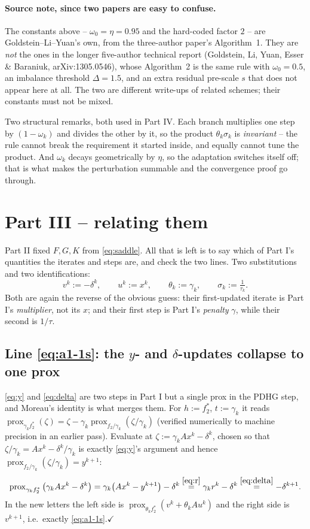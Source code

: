 \documentclass[11pt]{article}
\newcommand{\prox}{\operatorname{prox}}
\begin{document}
\paragraph{Source note, since two papers are easy to confuse.} The constants
above -- $\omega_0=\eta=0.95$ and the hard-coded factor $2$ -- are
Goldstein--Li--Yuan's own, from the three-author paper's Algorithm~1. They are
\emph{not} the ones in the longer five-author technical report
(Goldstein, Li, Yuan, Esser \& Baraniuk, arXiv:1305.0546), whose Algorithm~2 is
the same rule with $\omega_0=0.5$, an imbalance threshold $\Delta=1.5$, and an
extra residual pre-scale $s$ that does not appear here at all. The two are
different write-ups of related schemes; their constants must not be mixed.

Two structural remarks, both used in Part IV. Each branch multiplies one step by
$(1-\omega_k)$ and divides the other by it, so the product $\theta_k\sigma_k$ is
\emph{invariant} -- the rule cannot break the requirement it started inside, and
equally cannot tune the product. And $\omega_k$ decays geometrically by $\eta$, so
the adaptation switches itself off; that is what makes the perturbation summable
and the convergence proof go through.

\section*{Part III -- relating them}
Part II fixed $F,G,K$ from \eqref{eq:saddle}. All that is left is to say which of
Part I's quantities the iterates and steps are, and check the two lines. Two
substitutions and two identifications:
\[
v^k:=-\delta^k,\qquad u^k:=x^k,\qquad \theta_k:=\gamma_k,\qquad \sigma_k:=\tfrac1{\tau_k}.
\]
Both are again the reverse of the obvious guess: their first-updated iterate is
Part I's \emph{multiplier}, not its $x$; and their first step is Part I's
\emph{penalty} $\gamma$, while their second is $1/\tau$.

\subsection*{Line \eqref{eq:a1-1s}: the $y$- and $\delta$-updates collapse to one prox}
\eqref{eq:y} and \eqref{eq:delta} are two steps in Part I but a single prox in
the PDHG step, and Moreau's identity is what merges them. For $h:=f_2^*$,
$t:=\gamma_k$ it reads
$\prox_{\gamma_kf_2^*}(\zeta)=\zeta-\gamma_k\prox_{f_2/\gamma_k}(\zeta/\gamma_k)$ (verified
numerically to machine precision in an earlier pass). Evaluate at
$\zeta:=\gamma_kAx^{k}-\delta^{k}$, chosen so that $\zeta/\gamma_k=Ax^k-\delta^k/\gamma_k$
is exactly \eqref{eq:y}'s argument and hence
$\prox_{f_2/\gamma_k}(\zeta/\gamma_k)=y^{k+1}$:
\[
\prox_{\gamma_kf_2^*}\big(\gamma_kAx^{k}-\delta^{k}\big)
= \gamma_k\big(Ax^{k}-y^{k+1}\big)-\delta^{k}
\overset{\eqref{eq:r}}{=} \gamma_kr^{k}-\delta^{k}
\overset{\eqref{eq:delta}}{=} -\delta^{k+1}.
\]
In the new letters the left side is
$\prox_{\theta_kf_2^*}(v^k+\theta_kAu^k)$ and the right side is $v^{k+1}$, i.e.\
exactly \eqref{eq:a1-1s}.\quad$\checkmark$
\end{document}
